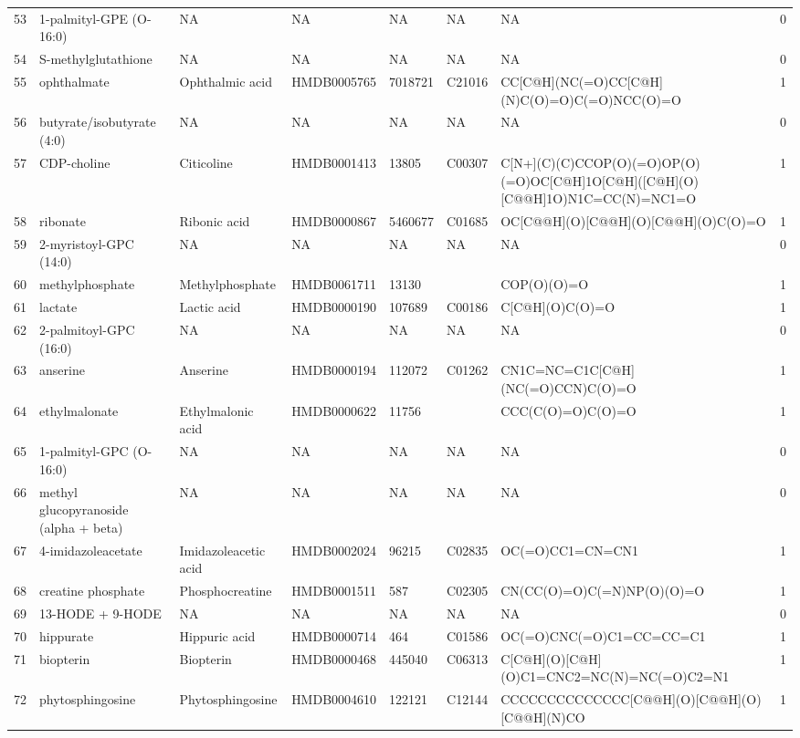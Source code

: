 \documentclass[a4paper]{article}
\begin{document}
\begin{longtable}{rlllllll}
  53 & 1-palmityl-GPE (O-16:0) & NA & NA & NA & NA & NA & 0 \\ 
  54 & S-methylglutathione & NA & NA & NA & NA & NA & 0 \\ 
  55 & ophthalmate & Ophthalmic acid & HMDB0005765 & 7018721 & C21016 & CC[C@H](NC(=O)CC[C@H](N)C(O)=O)C(=O)NCC(O)=O & 1 \\ 
  56 & butyrate/isobutyrate (4:0) & NA & NA & NA & NA & NA & 0 \\ 
  57 & CDP-choline & Citicoline & HMDB0001413 & 13805 & C00307 & C[N+](C)(C)CCOP(O)(=O)OP(O)(=O)OC[C@H]1O[C@H]([C@H](O)[C@@H]1O)N1C=CC(N)=NC1=O & 1 \\ 
  58 & ribonate & Ribonic acid & HMDB0000867 & 5460677 & C01685 & OC[C@@H](O)[C@@H](O)[C@@H](O)C(O)=O & 1 \\ 
  59 & 2-myristoyl-GPC (14:0) & NA & NA & NA & NA & NA & 0 \\ 
  60 & methylphosphate & Methylphosphate & HMDB0061711 & 13130 &  & COP(O)(O)=O & 1 \\ 
  61 & lactate & Lactic acid & HMDB0000190 & 107689 & C00186 & C[C@H](O)C(O)=O & 1 \\ 
  62 & 2-palmitoyl-GPC (16:0) & NA & NA & NA & NA & NA & 0 \\ 
  63 & anserine & Anserine & HMDB0000194 & 112072 & C01262 & CN1C=NC=C1C[C@H](NC(=O)CCN)C(O)=O & 1 \\ 
  64 & ethylmalonate & Ethylmalonic acid & HMDB0000622 & 11756 &  & CCC(C(O)=O)C(O)=O & 1 \\ 
  65 & 1-palmityl-GPC (O-16:0) & NA & NA & NA & NA & NA & 0 \\ 
  66 & methyl glucopyranoside (alpha + beta) & NA & NA & NA & NA & NA & 0 \\ 
  67 & 4-imidazoleacetate & Imidazoleacetic acid & HMDB0002024 & 96215 & C02835 & OC(=O)CC1=CN=CN1 & 1 \\ 
  68 & creatine phosphate & Phosphocreatine & HMDB0001511 & 587 & C02305 & CN(CC(O)=O)C(=N)NP(O)(O)=O & 1 \\ 
  69 & 13-HODE + 9-HODE & NA & NA & NA & NA & NA & 0 \\ 
  70 & hippurate & Hippuric acid & HMDB0000714 & 464 & C01586 & OC(=O)CNC(=O)C1=CC=CC=C1 & 1 \\ 
  71 & biopterin & Biopterin & HMDB0000468 & 445040 & C06313 & C[C@H](O)[C@H](O)C1=CNC2=NC(N)=NC(=O)C2=N1 & 1 \\ 
  72 & phytosphingosine & Phytosphingosine & HMDB0004610 & 122121 & C12144 & CCCCCCCCCCCCCC[C@@H](O)[C@@H](O)[C@@H](N)CO & 1 \\ 

\end{longtable}
\end{document}
